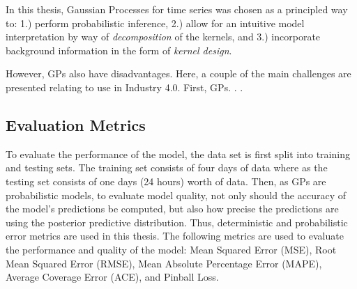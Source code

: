 In this thesis, Gaussian Processes for time series was chosen as a principled way to: 1.) perform probabilistic inference, 2.) allow for an intuitive model interpretation by way of \textit{decomposition} of the kernels, and 3.) incorporate background information in the form of \textit{kernel design}. 

However, GPs also have disadvantages. Here, a couple of the main challenges are presented relating to use in Industry 4.0. First, GPs. . .

\subsection{Evaluation Metrics}

To evaluate the performance of the model, the data set is first split into training and testing sets. The training set consists of four days of data where as the testing set consists of one days (24 hours) worth of data. Then, as GPs are probabilistic models, to evaluate model quality, not only should the accuracy of the model's predictions be computed, but also how precise the predictions are using the posterior predictive distribution. Thus, deterministic and probabilistic error metrics are used in this thesis. The following metrics are used to evaluate the performance and quality of the model: Mean Squared Error (MSE), Root Mean Squared Error (RMSE), Mean Absolute Percentage Error (MAPE), Average Coverage Error (ACE), and Pinball Loss.

